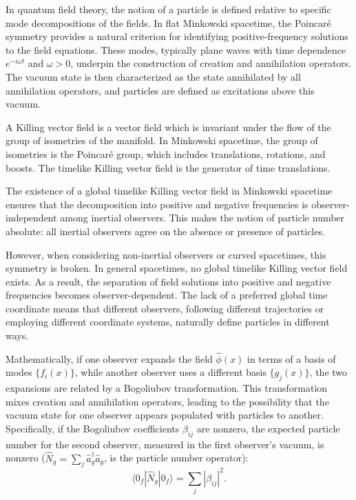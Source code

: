 In quantum field theory, the notion of a particle is defined relative to specific mode decompositions of the fields. In flat Minkowski spacetime, the Poincaré symmetry provides a natural criterion for identifying positive-frequency solutions to the field equations. These modes, typically plane waves with time dependence $e^{-i\omega t}$ and $\omega > 0$, underpin the construction of creation and annihilation operators. The vacuum state is then characterized as the state annihilated by all annihilation operators, and particles are defined as excitations above this vacuum.

A Killing vector field is a vector field which is invariant under the flow of the group of isometries of the manifold. In Minkowski spacetime, the group of isometries is the Poincaré group, which includes translations, rotations, and boosts. The timelike Killing vector field is the generator of time translations.

The existence of a global timelike Killing vector field in Minkowski spacetime ensures that the decomposition into positive and negative frequencies is observer-independent among inertial observers. This makes the notion of particle number absolute: all inertial observers agree on the absence or presence of particles.

However, when considering non-inertial observers or curved spacetimes, this symmetry is broken. In general spacetimes, no global timelike Killing vector field exists. As a result, the separation of field solutions into positive and negative frequencies becomes observer-dependent. The lack of a preferred global time coordinate means that different observers, following different trajectories or employing different coordinate systems, naturally define particles in different ways.

Mathematically, if one observer expands the field $\hat{\phi}(x)$ in terms of a basis of modes $\{f_i(x)\}$, while another observer uses a different basis $\{g_j(x)\}$, the two expansions are related by a Bogoliubov transformation. This transformation mixes creation and annihilation operators, leading to the possibility that the vacuum state for one observer appears populated with particles to another. Specifically, if the Bogoliubov coefficients $\beta_{ij}$ are nonzero, the expected particle number for the second observer, measured in the first observer's vacuum, is nonzero ($\hat{N}_g = \sum_j \hat{a}_g^\dagger \hat{a}_g$, is the particle number operator):
\[
\langle 0_f | \hat{N}_g | 0_f \rangle = \sum_j |\beta_{ij}|^2.
\]

